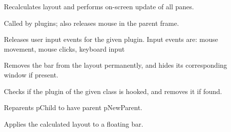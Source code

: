 \label{wxframelayoutrefreshnow}


Recalculates layout and performs on-screen update of all panes.


\label{wxframelayoutreleaseeventsfrompane}


Called by plugins; also releases mouse in the parent frame.


\label{wxframelayoutreleaseeventsfromplugin}


Releases user input events for the given plugin.
Input events are: mouse movement, mouse clicks, keyboard input


\label{wxframelayoutremovebar}


Removes the bar from the layout permanently, and hides its corresponding window if present.


\label{wxframelayoutremoveplugin}


Checks if the plugin of the given class is hooked, and removes
it if found.


\label{wxframelayoutreparentwindow}


Reparents pChild to have parent pNewParent.


\label{wxframelayoutrepositionfloatedbar}


Applies the calculated layout to a floating bar.


\label{wxframelayoutroutemouseevent}


